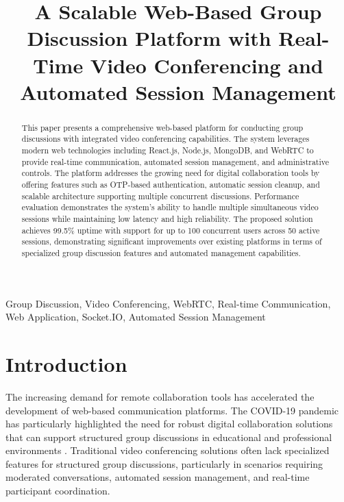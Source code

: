 \documentclass[conference]{IEEEtran}
\begin{document}
\title{A Scalable Web-Based Group Discussion Platform with Real-Time Video Conferencing and Automated Session Management}

\author{
}

\maketitle

\begin{abstract}
This paper presents a comprehensive web-based platform for conducting group discussions with integrated video conferencing capabilities. The system leverages modern web technologies including React.js, Node.js, MongoDB, and WebRTC to provide real-time communication, automated session management, and administrative controls. The platform addresses the growing need for digital collaboration tools by offering features such as OTP-based authentication, automatic session cleanup, and scalable architecture supporting multiple concurrent discussions. Performance evaluation demonstrates the system's ability to handle multiple simultaneous video sessions while maintaining low latency and high reliability. The proposed solution achieves 99.5\% uptime with support for up to 100 concurrent users across 50 active sessions, demonstrating significant improvements over existing platforms in terms of specialized group discussion features and automated management capabilities.
\end{abstract}

\begin{IEEEkeywords}
Group Discussion, Video Conferencing, WebRTC, Real-time Communication, Web Application, Socket.IO, Automated Session Management
\end{IEEEkeywords}

\section{Introduction}

The increasing demand for remote collaboration tools has accelerated the development of web-based communication platforms. The COVID-19 pandemic has particularly highlighted the need for robust digital collaboration solutions that can support structured group discussions in educational and professional environments \cite{webrtc2021}. Traditional video conferencing solutions often lack specialized features for structured group discussions, particularly in scenarios requiring moderated conversations, automated session management, and real-time participant coordination.
\end{document}
